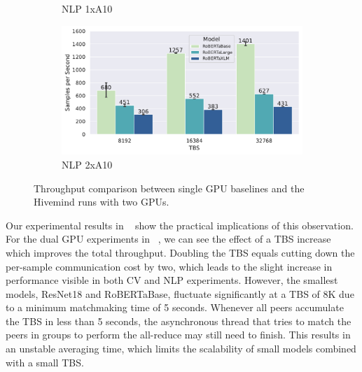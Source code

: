\begin{figure}
\begin{subfigure}[c]{0.23\textwidth}
        \vspace{-18pt}
        \caption{NLP 1xA10}
        \label{fig:nlp-1xa10-baseline}
    \end{subfigure}
    \begin{subfigure}[c]{0.23\textwidth}
        \includegraphics[width=\textwidth]{figures/misc/nlp_2xa10_all-tbs_hivemind}
        \vspace{-18pt}
        \caption{NLP 2xA10} 
        \label{fig:nlp-2xa10-hivemind}
    \end{subfigure}
    \vspace{-10pt}
    \caption{Throughput comparison between single GPU baselines and the Hivemind runs with two GPUs.}
    \label{fig:1x-vs-2xa10-throughput-comparison}
    \vspace*{-6mm}
\end{figure}

Our experimental results in ~ show the practical implications of this observation.
For the dual GPU experiments in ~, we can see the effect of a TBS increase which improves the total throughput.
Doubling the TBS equals cutting down the per-sample communication cost by two, which leads to the slight increase in performance visible in both CV and NLP experiments.
However, the smallest models, ResNet18 and RoBERTaBase, fluctuate significantly at a TBS of 8K due to a minimum matchmaking time of 5 seconds. 
Whenever all peers accumulate the TBS in less than 5 seconds, the asynchronous thread that tries to match the peers in groups to perform the all-reduce may still need to finish.
This results in an unstable averaging time, which limits the scalability of small models combined with a small TBS.

